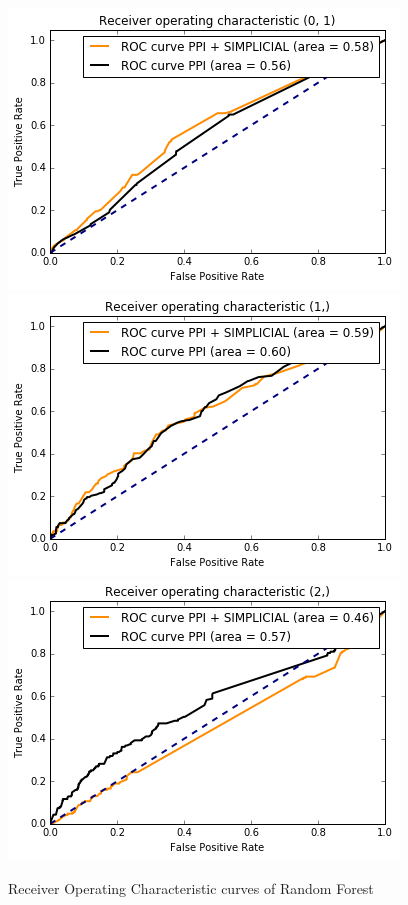 \documentclass[9pt]{article}
\begin{document}
\newpage
\begin{figure}[!htb]
  \includegraphics[width=\linewidth]{logisticRegressionGraphs/forS1.png}
\endminipage\hfill
{}
  \includegraphics[width=\linewidth]{logisticRegressionGraphs/forS2.png}
\endminipage\hfill
{}%
  \includegraphics[width=\linewidth]{logisticRegressionGraphs/forS3.png}
\endminipage
\caption{Receiver Operating Characteristic curves of Random Forest}
\end{figure}
\end{document}
